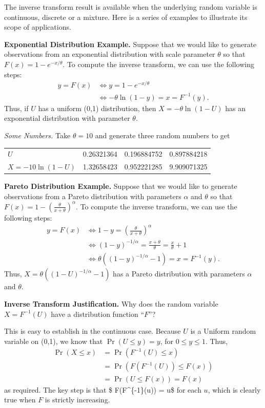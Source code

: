 \documentclass[]{book}
\theoremstyle{definition}
\theoremstyle{definition}
\theoremstyle{definition}
\theoremstyle{remark}
\begin{document}
The inverse transform result is available when the underlying random
variable is continuous, discrete or a mixture. Here is a series of
examples to illustrate its scope of applications.

\textbf{Exponential Distribution Example.} Suppose that we would like to
generate observations from an exponential distribution with scale
parameter \(\theta\) so that \(F(x) = 1 - e^{-x/\theta}\). To compute
the inverse transform, we can use the following steps: \[\begin{aligned}
 y = F(x) &\Leftrightarrow  y = 1-e^{-x/\theta} \\
  &\Leftrightarrow -\theta \ln(1-y) = x = F^{-1}(y) .\end{aligned}\]
Thus, if \(U\) has a uniform (0,1) distribution, then
\(X = -\theta \ln(1-U)\) has an exponential distribution with parameter
\(\theta\).

\emph{Some Numbers.} Take \(\theta = 10\) and generate three random
numbers to get

\begin{longtable}[]{@{}lrrr@{}}
\toprule
\(U\) & 0.26321364 & 0.196884752 & 0.897884218\tabularnewline
\(X = -10\ln(1-U)\) & 1.32658423 & 0.952221285 &
9.909071325\tabularnewline
\bottomrule
\end{longtable}

\textbf{Pareto Distribution Example.} Suppose that we would like to
generate observations from a Pareto distribution with parameters
\(\alpha\) and \(\theta\) so that
\(F(x) = 1 - \left(\frac{\theta}{x+\theta} \right)^{\alpha}\). To
compute the inverse transform, we can use the following steps:
\[\begin{aligned}
 y = F(x) &\Leftrightarrow 1-y = \left(\frac{\theta}{x+\theta} \right)^{\alpha} \\
  &\Leftrightarrow \left(1-y\right)^{-1/\alpha} = \frac{x+\theta}{\theta} = \frac{x}{\theta} +1 \\
    &\Leftrightarrow \theta \left((1-y)^{-1/\alpha} - 1\right) = x = F^{-1}(y) .\end{aligned}\]
Thus, \(X = \theta \left((1-U)^{-1/\alpha} - 1\right)\) has a Pareto
distribution with parameters \(\alpha\) and \(\theta\).

\textbf{Inverse Transform Justification.} Why does the random variable
\(X = F^{-1}(U)\) have a distribution function ``\(F\)''?

This is easy to establish in the continuous case. Because \(U\) is a
Uniform random variable on (0,1), we know that \(\Pr(U \le y) = y\), for
\(0 \le y \le 1\). Thus, \[\begin{aligned}
\Pr(X \le x) &= \Pr(F^{-1}(U) \le x) \\
 &= \Pr(F(F^{-1}(U)) \le F(x)) \\
&= \Pr(U \le F(x)) = F(x)\end{aligned}\] as required. The key step is
that \$ F(F\^{}\{-1\}(u)) = u\$ for each \(u\), which is clearly true
when \(F\) is strictly increasing.
\end{document}
